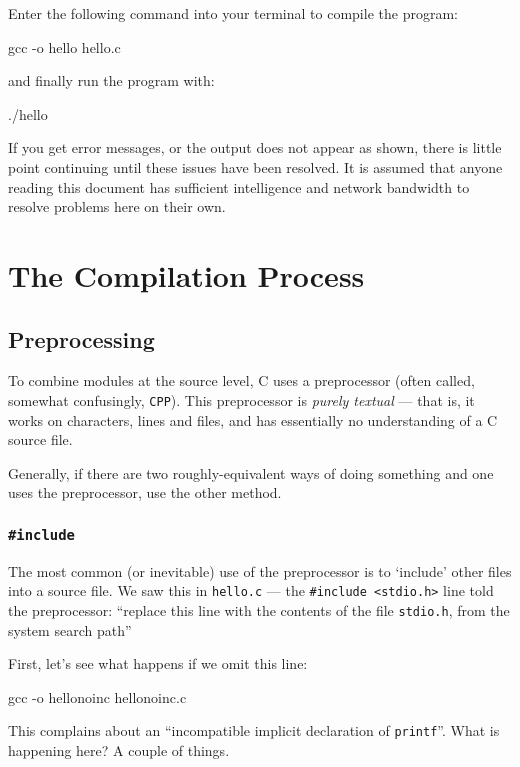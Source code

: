 \documentclass[a4paper,10pt]{article}
\newcommand{\drmcode}[3]{\begin{minipage}{\columnwidth}\end{minipage}}
\newcommand{\ccode}[2]{\drmcode{C}{#1}{#2.c}}
\newcommand{\kw}[1]{\texttt{#1}}
\newcommand{\cfile}[1]{\texttt{#1}}
\begin{document}
\noindent
Enter the following command into your terminal to compile
the program:

gcc -o hello hello.c
\END

\noindent
and finally run the program with:

./hello
\END

\noindent{}
If you get error messages, or the output does not appear as shown,
there is little point continuing until these issues have been
resolved. It is assumed that anyone reading this document has
sufficient intelligence and network bandwidth to resolve problems here
on their own.

\section{The Compilation Process}



\subsection{Preprocessing}

To combine modules at the source level, C uses a preprocessor (often
called, somewhat confusingly, \kw{CPP}). This preprocessor is
\emph{purely textual} --- that is, it works on characters, lines and
files, and has essentially no understanding of a C source file.



Generally, if there are two roughly-equivalent ways of doing something
and one uses the preprocessor, use the other method.

\subsubsection{\kw{\#include}}

The most common (or inevitable) use of the preprocessor is to
`include' other files into a source file. We saw this in \cfile{hello.c}
--- the \verb!#include <stdio.h>! line told the preprocessor:
``replace this line with the contents of the file \cfile{stdio.h}, from
the system search path''

First, let's see what happens if we omit this line:

\ccode{\cfile{hellonoinc.c}}{hellonoinc}

gcc -o hellonoinc hellonoinc.c
\END

\noindent
This complains about an ``incompatible implicit declaration of
\kw{printf}''. What is happening here? A couple of things.
\end{document}
